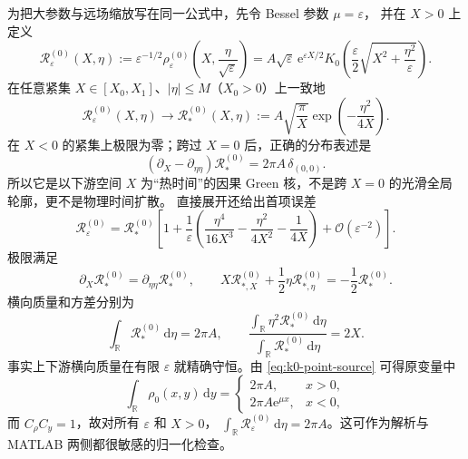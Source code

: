 \documentclass[11pt,a4paper,fontset=fandol]{ctexart}
\newcommand{\R}{\mathbb{R}}
\newcommand{\dd}{\,\mathrm d}
\newcommand{\e}{\mathrm e}
\newcommand{\abs}[1]{\left\lvert #1\right\rvert}
\newcommand{\Order}{\mathcal O}
\begin{document}
为把大参数与远场缩放写在同一公式中，先令 Bessel 参数 $\mu=\varepsilon$，
并在 $X>0$ 上定义
\begin{equation}
  \mathcal R^{(0)}_\varepsilon(X,\eta)
  :=\varepsilon^{-1/2}
  \rho^{(0)}_\varepsilon\!\left(X,\frac{\eta}{\sqrt\varepsilon}\right)
  =A\sqrt\varepsilon\,\e^{\varepsilon X/2}
  K_0\!\left(
    \frac{\varepsilon}{2}\sqrt{X^2+\frac{\eta^2}{\varepsilon}}
  \right).
  \label{eq:k0-rescaled}
\end{equation}
在任意紧集 $X\in[X_0,X_1]$、$\abs\eta\le M$（$X_0>0$）上一致地
\begin{equation}
  \mathcal R^{(0)}_\varepsilon(X,\eta)
  \longrightarrow
  \mathcal R^{(0)}_*(X,\eta)
  :=A\sqrt{\frac{\pi}{X}}
  \exp\!\left(-\frac{\eta^2}{4X}\right).
  \label{eq:k0-limit}
\end{equation}
在 $X<0$ 的紧集上极限为零；跨过 $X=0$ 后，正确的分布表述是
\begin{equation}
  (\partial_X-\partial_{\eta\eta})\mathcal R^{(0)}_*
  =2\pi A\,\delta_{(0,0)}.
  \label{eq:heat-source}
\end{equation}
所以它是以下游空间 $X$ 为“热时间”的因果 Green 核，不是跨
$X=0$ 的光滑全局轮廓，更不是物理时间扩散。
直接展开还给出首项误差
\begin{equation}
  \mathcal R^{(0)}_\varepsilon
  =\mathcal R^{(0)}_*
  \left[1+\frac1\varepsilon\left(
  \frac{\eta^4}{16X^3}-\frac{\eta^2}{4X^2}-\frac1{4X}
  \right)+\Order(\varepsilon^{-2})\right].
  \label{eq:k0-correction}
\end{equation}
极限满足
\begin{equation}
  \partial_X\mathcal R^{(0)}_*
  =\partial_{\eta\eta}\mathcal R^{(0)}_*,
  \qquad
  X\mathcal R^{(0)}_{*,X}
  +\frac12\eta\mathcal R^{(0)}_{*,\eta}
  =-\frac12\mathcal R^{(0)}_*.
  \label{eq:k0-heat-homogeneity}
\end{equation}
横向质量和方差分别为
\begin{equation}
  \int_\R\mathcal R^{(0)}_*\dd\eta=2\pi A,
  \qquad
  \frac{\int_\R\eta^2\mathcal R^{(0)}_*\dd\eta}
       {\int_\R\mathcal R^{(0)}_*\dd\eta}=2X.
\end{equation}
事实上下游横向质量在有限 $\varepsilon$ 就精确守恒。由
\eqref{eq:k0-point-source} 可得原变量中
\begin{equation}
  \int_\R\rho_0(x,y)\dd y=
  \begin{cases}
    2\pi A, & x>0,\\
    2\pi A\e^{\mu x}, & x<0,
  \end{cases}
\end{equation}
而 $C_\rho C_y=1$，故对所有 $\varepsilon$ 和 $X>0$，
$\int_\R\mathcal R^{(0)}_\varepsilon\dd\eta=2\pi A$。这可作为解析与
MATLAB 两侧都很敏感的归一化检查。
\end{document}
